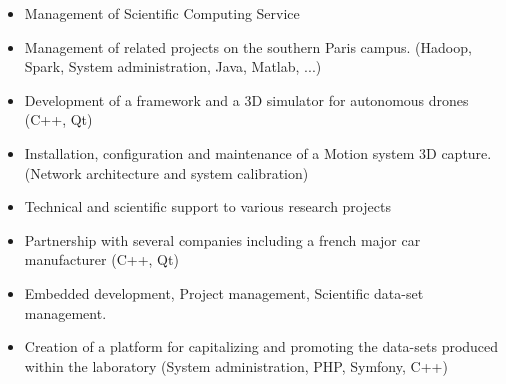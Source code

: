 \divider

\begin{itemize}
    \item Management of Scientific Computing Service
    \item Management of related projects on the southern Paris campus. (Hadoop, Spark, System administration, Java, Matlab, ...)
\end{itemize}

\divider

\begin{itemize}
    \item Development of a framework and a 3D simulator for autonomous drones (C++, Qt)
    \item Installation, configuration and maintenance of a Motion system 3D capture. (Network architecture and system calibration)
    \item Technical and scientific support to various research projects
    \item Partnership with several companies including a french major car manufacturer (C++, Qt)
    \item Embedded development, Project management, Scientific data-set management.
    \item Creation of a platform for capitalizing and promoting the data-sets produced within the laboratory (System administration, PHP, Symfony, C++)
\end{itemize}